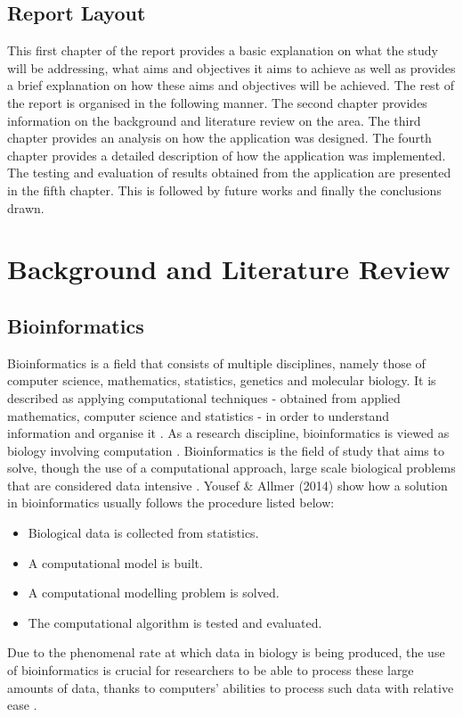 \documentclass{cisfyp}
\begin{document}
\section{Report Layout}
This first chapter of the report provides a basic explanation on what the study will be addressing, what aims and objectives it aims to achieve as well as provides a brief explanation on how these aims and objectives will be achieved. The rest of the report is organised in the following manner. The second chapter provides information on the background and literature review on the area. The third chapter provides an analysis on how the application was designed. The fourth chapter provides a detailed description of how the application was implemented. The testing and evaluation of results obtained from the application are presented in the fifth chapter. This is followed by future works and finally the conclusions drawn.
\pagebreak

\chapter{Background and Literature Review}
\section{Bioinformatics}
Bioinformatics is a field that consists of multiple disciplines, namely those of computer science, mathematics, statistics, genetics and molecular biology. It is described as applying computational techniques - obtained from applied mathematics, computer science and statistics - in order to understand information and organise it \cite{luscombe2001}. As a research discipline, bioinformatics is viewed as biology involving computation \cite{2011}. Bioinformatics is the field of study that aims to solve, though the use of a computational approach, large scale biological problems that are considered data intensive \cite{yousef_allmer_2014}. Yousef \& Allmer (2014) show how a solution in bioinformatics usually follows the procedure listed below: 
\begin{itemize}
	\item Biological data is collected from statistics.
	\item A computational model is built.
	\item A computational modelling problem is solved.
	\item The computational algorithm is tested and evaluated.
\end{itemize}
Due to the phenomenal rate at which data in biology is being produced, the use of bioinformatics is crucial for researchers to be able to process these large amounts of data, thanks to computers' abilities to process such data with relative ease \cite{luscombe2001}.
\end{document}
